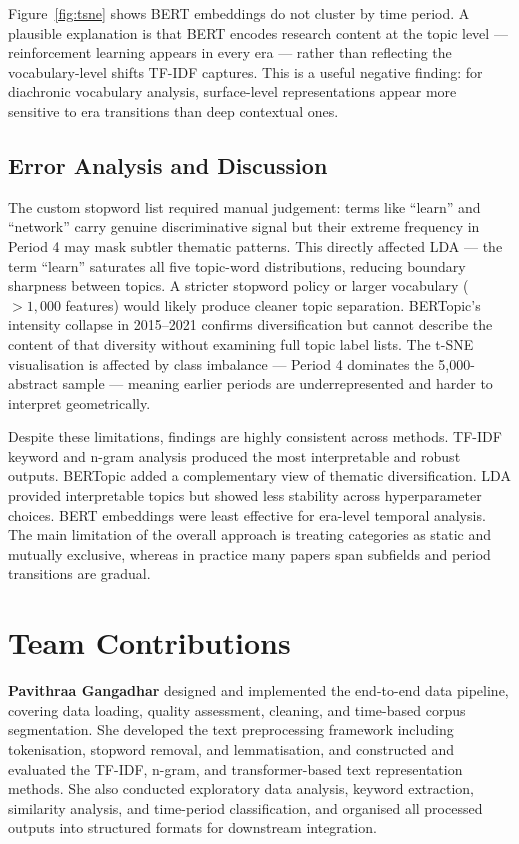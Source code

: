 \documentclass{article}
\begin{document}
Figure~\ref{fig:tsne} shows BERT embeddings do not cluster
by time period. A plausible explanation is that BERT encodes
research content at the topic level — reinforcement learning
appears in every era — rather than reflecting the
vocabulary-level shifts TF-IDF captures. This is a useful
negative finding: for diachronic vocabulary analysis,
surface-level representations appear more sensitive to era
transitions than deep contextual ones.

\subsection{Error Analysis and Discussion}

The custom stopword list required manual judgement: terms
like ``learn'' and ``network'' carry genuine discriminative
signal but their extreme frequency in Period 4 may mask
subtler thematic patterns. This directly affected LDA —
the term ``learn'' saturates all five topic-word
distributions, reducing boundary sharpness between topics.
A stricter stopword policy or larger vocabulary
($>1{,}000$ features) would likely produce cleaner topic
separation. BERTopic's intensity collapse in 2015--2021
confirms diversification but cannot describe the content
of that diversity without examining full topic label lists.
The t-SNE visualisation is affected by class imbalance —
Period 4 dominates the 5,000-abstract sample — meaning
earlier periods are underrepresented and harder to
interpret geometrically.

Despite these limitations, findings are highly consistent
across methods. TF-IDF keyword and n-gram analysis produced
the most interpretable and robust outputs. BERTopic added
a complementary view of thematic diversification. LDA
provided interpretable topics but showed less stability
across hyperparameter choices. BERT embeddings were least
effective for era-level temporal analysis. The main
limitation of the overall approach is treating categories
as static and mutually exclusive, whereas in practice many
papers span subfields and period transitions are gradual.


\section{Team Contributions}
\label{sec:contributions}

\textbf{Pavithraa Gangadhar} designed and implemented the
end-to-end data pipeline, covering data loading, quality
assessment, cleaning, and time-based corpus segmentation.
She developed the text preprocessing framework including
tokenisation, stopword removal, and lemmatisation, and
constructed and evaluated the TF-IDF, n-gram, and
transformer-based text representation methods. She also
conducted exploratory data analysis, keyword extraction,
similarity analysis, and time-period classification, and
organised all processed outputs into structured formats
for downstream integration.
\end{document}
